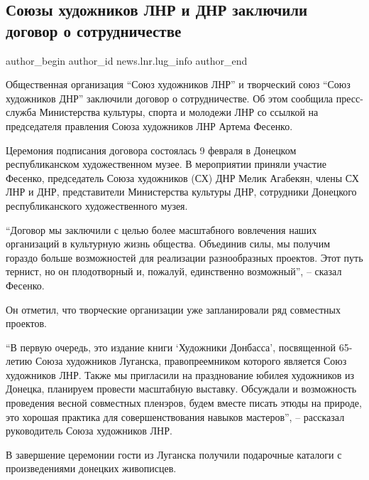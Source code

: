  
 
 
 
 
 
\subsection{Союзы художников ЛНР и ДНР заключили договор о сотрудничестве}
\label{sec:10_02_2022.stz.news.lnr.lug_info.1.sojuzy_hudozhnikov_dnr_lnr}
 
\ifcmt
 author_begin
   author_id news.lnr.lug_info
 author_end
\fi

Общественная организация \enquote{Союз художников ЛНР} и творческий союз \enquote{Союз
художников ДНР} заключили договор о сотрудничестве. Об этом сообщила
пресс-служба Министерства культуры, спорта и молодежи ЛНР со ссылкой на
председателя правления Союза художников ЛНР Артема Фесенко.


Церемония подписания договора состоялась 9 февраля в Донецком республиканском
художественном музее. В мероприятии приняли участие Фесенко, председатель Союза
художников (СХ) ДНР Мелик Агабекян, члены СХ ЛНР и ДНР, представители
Министерства культуры ДНР, сотрудники Донецкого республиканского
художественного музея.


\enquote{Договор мы заключили с целью более масштабного вовлечения наших организаций в
культурную жизнь общества. Объединив силы, мы получим гораздо больше
возможностей для реализации разнообразных проектов. Этот путь тернист, но он
плодотворный и, пожалуй, единственно возможный}, – сказал Фесенко.

Он отметил, что творческие организации уже запланировали ряд совместных
проектов.

\enquote{В первую очередь, это издание книги \enquote{Художники Донбасса},
посвященной 65-летию Союза художников Луганска, правопреемником которого
является Союз художников ЛНР. Также мы пригласили на празднование юбилея
художников из Донецка, планируем провести масштабную выставку. Обсуждали и
возможность проведения весной совместных пленэров, будем вместе писать этюды на
природе, это хорошая практика для совершенствования навыков мастеров}, –
рассказал руководитель Союза художников ЛНР.

В завершение церемонии гости из Луганска получили подарочные каталоги с
произведениями донецких живописцев.
